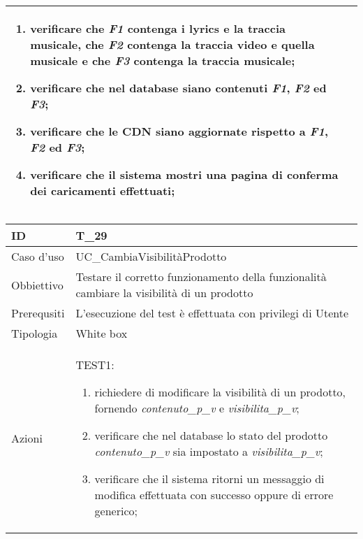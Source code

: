 \begin{table}[hb]
\begin{tabular}{ |p{2cm}|p{10cm}|  }
\begin{enumerate}[nosep, topsep=0pt]
            \item verificare che \emph{F1} contenga i lyrics e la traccia musicale, che \emph{F2} contenga la traccia video e quella musicale e che \emph{F3} contenga la traccia musicale;
            \item verificare che nel database siano contenuti \emph{F1}, \emph{F2} ed \emph{F3};
            \item verificare che le CDN siano aggiornate rispetto a \emph{F1}, \emph{F2} ed \emph{F3};
            \item verificare che il sistema mostri una pagina di conferma dei caricamenti effettuati;
        \end{enumerate}
        \\\hline
    \end{tabular}
\end{table}

\begin{table}[hb]
    \centering
    \begin{tabular}{ |p{2cm}|p{10cm}|  }
        \hline
        ID          & T\_29                                                                                      \\\hline
        Caso d'uso  & UC\_CambiaVisibilitàProdotto                                                               \\\hline
        Obbiettivo  & Testare il corretto funzionamento della funzionalità cambiare la visibilità di un prodotto \\\hline
        Prerequsiti & L'esecuzione del test è effettuata con privilegi di Utente                                 \\\hline
        Tipologia   & White box                                                                                  \\\hline
        Azioni      &
        TEST1:
        \begin{enumerate}[nosep, topsep=0pt]
            \item richiedere di modificare la visibilità di un prodotto, fornendo \emph{contenuto\_p\_v} e \emph{visibilita\_p\_v};
            \item verificare che nel database lo stato del prodotto \emph{contenuto\_p\_v} sia impostato a \emph{visibilita\_p\_v};
            \item verificare che il sistema ritorni un messaggio di modifica effettuata con successo oppure di errore generico;
        \end{enumerate}
        \\\hline
    \end{tabular}
\end{table}

